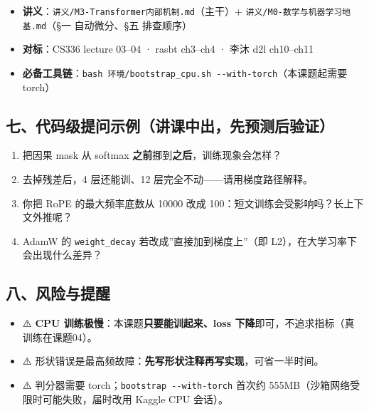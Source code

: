 \documentclass[
  chinese,
  11pt,
]{ctexart}
\providecommand{\tightlist}{%
  \setlength{\itemsep}{0pt}\setlength{\parskip}{0pt}}
\begin{document}
\begin{itemize}
\tightlist
\item
  \textbf{讲义}：\texttt{讲义/M3-Transformer内部机制.md}（主干）+ \texttt{讲义/M0-数学与机器学习地基.md}（§一 自动微分、§五 排查顺序）
\item
  \textbf{对标}：CS336 lecture 03--04 · rasbt ch3--ch4 · 李沐 d2l ch10--ch11
\item
  \textbf{必备工具链}：\texttt{bash\ 环境/bootstrap\_cpu.sh\ -\/-with-torch}（本课题起需要 torch）
\end{itemize}

\subsection{七、代码级提问示例（讲课中出，先预测后验证）}\label{ux4e03ux4ee3ux7801ux7ea7ux63d0ux95eeux793aux4f8bux8bb2ux8bfeux4e2dux51faux5148ux9884ux6d4bux540eux9a8cux8bc1}

\begin{enumerate}
\def\labelenumi{\arabic{enumi}.}
\tightlist
\item
  把因果 mask 从 softmax \textbf{之前}挪到\textbf{之后}，训练现象会怎样？
\item
  去掉残差后，4 层还能训、12 层完全不动------请用梯度路径解释。
\item
  你把 RoPE 的最大频率底数从 10000 改成 100：短文训练会受影响吗？长上下文外推呢？
\item
  AdamW 的 \texttt{weight\_decay} 若改成''直接加到梯度上''（即 L2），在大学习率下会出现什么差异？
\end{enumerate}

\subsection{八、风险与提醒}\label{ux516bux98ceux9669ux4e0eux63d0ux9192}

\begin{itemize}
\tightlist
\item
  ⚠️ \textbf{CPU 训练极慢}：本课题\textbf{只要能训起来、loss 下降}即可，不追求指标（真训练在课题04）。
\item
  ⚠️ 形状错误是最高频故障：\textbf{先写形状注释再写实现}，可省一半时间。
\item
  ⚠️ 判分器需要 torch；\texttt{bootstrap\ -\/-with-torch} 首次约 555MB（沙箱网络受限时可能失败，届时改用 Kaggle CPU 会话）。
\end{itemize}

\newpage
\end{document}
